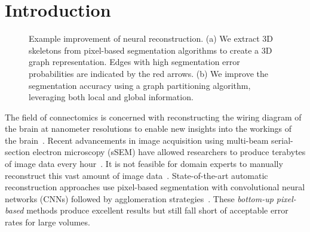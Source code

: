 \section{Introduction}

\begin{figure}[t]
	\caption{Example improvement of neural reconstruction. (a) We extract 3D skeletons from pixel-based segmentation algorithms to create a 3D graph representation. Edges with high segmentation error probabilities are indicated by the red arrows. (b) We improve the segmentation accuracy using a graph partitioning algorithm, leveraging both local and global information.}
	\label{fig:teaser}
\end{figure}

The field of connectomics is concerned with reconstructing the wiring diagram of the brain at nanometer resolutions to enable new insights into the workings of the brain~\cite{haehn2017scalable,kasthuri2015saturated}. Recent advancements in image acquisition using multi-beam serial-section electron microscopy (sSEM) have allowed researchers to produce terabytes of image data every hour~\cite{hildebrand2017whole}. It is not feasible for domain experts to manually reconstruct this vast amount of image data~\cite{haehn2014design}. State-of-the-art automatic reconstruction approaches use pixel-based segmentation with convolutional neural networks (CNNs) followed by agglomeration strategies~\cite{seymour2016rhoananet,lee2015recursive,nunez2014graph,parag2017anisotropic,ronneberger2015u,zlateski2015image}.
These \textit{bottom-up pixel-based} methods produce excellent results but still fall short of acceptable error rates for large volumes.

